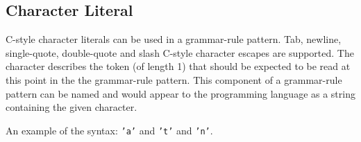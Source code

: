 
\subsection{Character Literal}
{
	C-style character literals can be used in a grammar-rule pattern.
	Tab, newline, single-quote, double-quote and slash C-style character
	escapes are supported.
	The character describes the token (of length 1) that should be expected
	to be read at this point in the the grammar-rule pattern.
	This component of a grammar-rule pattern can be named and would appear to
	the programming language as a string containing the given character.
	
	An example of the syntax: \texttt{'a'} and \texttt{'t'}
	and \texttt{'n'}.
}
